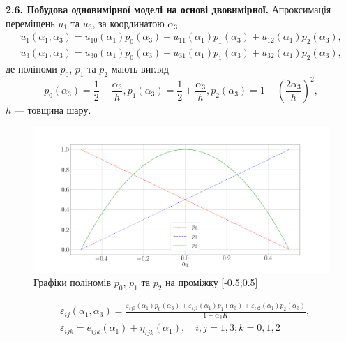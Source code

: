 \documentclass[10pt,a4paper]{article}
\numberwithin{figure}{section}
\numberwithin{equation}{section}
\begin{document}
\textbf{2.6. Побудова одновимірної моделі на основі двовимірної.}
\linebreak
\linebreak
Апроксимація переміщень $u_1$ та $u_3$, за координатою $\alpha_3$ 
\begin{align}
u_1 \left( \alpha_1, \alpha_3 \right) = u_{10} \left( \alpha_1\right)p_0 \left( \alpha_3\right)+u_{11} \left( \alpha_1\right)p_1 \left( \alpha_3\right)+u_{12} \left( \alpha_1\right)p_2 \left( \alpha_3\right),\\
u_3 \left( \alpha_1, \alpha_3 \right) = u_{30} \left( \alpha_1\right)p_0 \left( \alpha_3\right)+u_{31} \left( \alpha_1\right)p_1 \left( \alpha_3\right)+u_{32} \left( \alpha_1\right)p_2 \left( \alpha_3\right),
\end{align}
де поліноми $p_0$, $p_1$ та $p_2$ мають вигляд
\begin{equation}
p_0 \left( \alpha_3\right) = \frac12-\frac{\alpha_3}{h},
p_1 \left( \alpha_3\right) = \frac12+\frac{\alpha_3}{h},
p_2 \left( \alpha_3\right) = 1-\left(\frac{2\alpha_3}{h}\right)^2,
\end{equation}
$h$ --- товщина шару.
\begin{figure}
\includegraphics[scale=0.1]{pic/polin.png}
\caption{Графіки поліномів $p_0$, $p_1$ та $p_2$ на проміжку [-0.5;0.5]}
\end{figure}


\begin{equation}
\begin{aligned}
&\varepsilon_{ij} \left( \alpha_1, \alpha_3 \right) = \frac{\varepsilon_{ij0} \left( \alpha_1\right)p_0 \left( \alpha_3\right)+\varepsilon_{ij1} \left( \alpha_1\right)p_1 \left( \alpha_3\right)+\varepsilon_{ij2} \left( \alpha_1\right)p_2 \left( \alpha_3\right)}{1+\alpha_3 K},\\
&\varepsilon_{ijk} = e_{ijk}\left( \alpha_1\right)+\eta_{ijk}\left( \alpha_1\right), \quad i,j=1,3; k=0,1,2
\end{aligned}
\end{equation}
\end{document}
